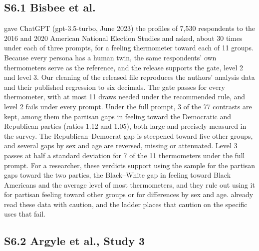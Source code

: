 \subsection*{S6.1 Bisbee et al.}

\citet{bisbee2024synthetic} gave ChatGPT (gpt-3.5-turbo, June 2023) the profiles of 7,530 respondents to the 2016 and 2020 American National Election Studies and asked, about 30 times under each of three prompts, for a feeling thermometer toward each of 11 groups. %
Because every persona has a human twin, the same respondents' own thermometers serve as the reference, and the release supports the gate, level 2 and level 3.
Our cleaning of the released file reproduces the authors' analysis data and their published regression to six decimals. %
The gate passes for every thermometer, with at most 11 draws needed under the recommended rule, and level 2 fails under every prompt. %
Under the full prompt, 3 of the 77 contrasts are kept, among them the partisan gaps in feeling toward the Democratic and Republican parties (ratios 1.12 and 1.05), both large and precisely measured in the survey. %
The Republican--Democrat gap is steepened toward five other groups, and several gaps by sex and age are reversed, missing or attenuated. %
Level 3 passes at half a standard deviation for 7 of the 11 thermometers under the full prompt. %
For a researcher, these verdicts support using the sample for the partisan gaps toward the two parties, the Black--White gap in feeling toward Black Americans and the average level of most thermometers, and they rule out using it for partisan feeling toward other groups or for differences by sex and age.
\citet{bisbee2024synthetic} already read these data with caution, and the ladder places that caution on the specific uses that fail.

\subsection*{S6.2 Argyle et al., Study 3}

